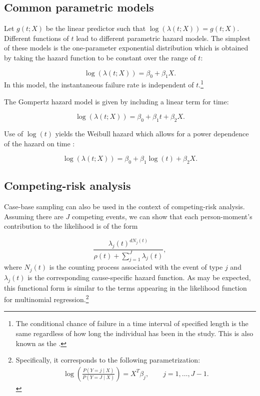 \hypertarget{common-parametric-models}{%
\subsection{Common parametric models}\label{common-parametric-models}}

Let \(g(t; X)\) be the linear predictor such that
\(\log(\lambda(t;X)) = g(t; X)\). Different functions of \(t\) lead to
different parametric hazard models. The simplest of these models is the
one-parameter exponential distribution which is obtained by taking the
hazard function to be constant over the range of \(t\):

\begin{equation}
\log(\lambda(t; X)) = \beta_0 + \beta_1 X. \label{eq:exp}
\end{equation} In this model, the instantaneous failure rate is
independent of
\(t\).\footnote{The conditional chance of failure in a time interval of specified length is the same regardless of how long the individual has been in the study. This is also known as the  \citep{kalbfleisch2011statistical}.}

The Gompertz hazard model is given by including a linear term for time:

\begin{equation}
\log(\lambda(t; X)) = \beta_0 + \beta_1 t + \beta_2 X. \label{eq:gomp}
\end{equation}

Use of \(\log(t)\) yields the Weibull hazard which allows for a power
dependence of the hazard on time \citep{kalbfleisch2011statistical}:

\begin{equation}
\log(\lambda(t; X)) = \beta_0 + \beta_1 \log(t) + \beta_2 X. \label{eq:weibull}
\end{equation}

\hypertarget{competing-risk-analysis}{%
\subsection{Competing-risk analysis}\label{competing-risk-analysis}}

Case-base sampling can also be used in the context of competing-risk
analysis. Assuming there are \(J\) competing events, we can show that
each person-moment's contribution to the likelihood is of the form

\[\frac{\lambda_j(t)^{dN_j(t)}}{\rho(t) + \sum_{j=1}^J\lambda_j(t)},\]
where \(N_j(t)\) is the counting process associated with the event of
type \(j\) and \(\lambda_j(t)\) is the corresponding cause-specific
hazard function. As may be expected, this functional form is similar to
the terms appearing in the likelihood function for multinomial
regression.\footnote{Specifically, it corresponds to the following parametrization: \begin{align*} \log\left(\frac{P(Y=j \mid X)}{P(Y = J \mid X)}\right) = X^T\beta_j, \qquad j = 1,\ldots, J-1.\end{align*}}

